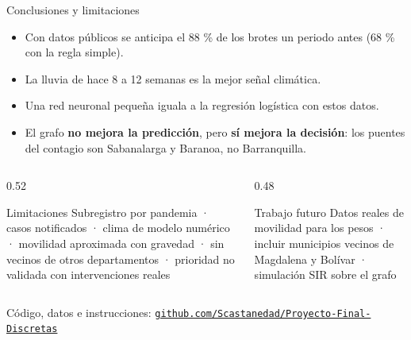 \documentclass[aspectratio=169,10pt]{beamer}
\newcommand{\pA}{Samuel Castañeda}
\newcommand{\orador}{}
\newcommand{\persona}[2]{\renewcommand{\orador}{Persona #1 · #2}}
\begin{document}
\persona{1}{\pA}
\begin{frame}{Conclusiones y limitaciones}
  \begin{itemize}\setlength\itemsep{5pt}
    \item Con datos públicos se anticipa el \alert{88 \%} de los brotes un periodo antes (68 \% con la regla simple).
    \item La lluvia de hace \alert{8 a 12 semanas} es la mejor señal climática.
    \item Una red neuronal pequeña \alert{iguala} a la regresión logística con estos datos.
    \item El grafo \textbf{no mejora la predicción}, pero \textbf{sí mejora la decisión}: los puentes del contagio son Sabanalarga y Baranoa, no Barranquilla.
  \end{itemize}
  \vspace{0.15cm}
  \begin{columns}[T]
    \begin{column}{0.52\textwidth}
      \begin{block}{Limitaciones}
        \footnotesize
        Subregistro por pandemia · casos notificados · clima de modelo numérico · movilidad aproximada con gravedad · sin vecinos de otros departamentos · prioridad no validada con intervenciones reales
      \end{block}
    \end{column}
    \begin{column}{0.48\textwidth}
      \begin{block}{Trabajo futuro}
        \footnotesize
        Datos reales de movilidad para los pesos · incluir municipios vecinos de Magdalena y Bolívar · simulación SIR sobre el grafo
      \end{block}
    \end{column}
  \end{columns}
  \vspace{0.2cm}
  \centering\small Código, datos e instrucciones: \href{https://github.com/Scastanedad/Proyecto-Final-Discretas}{\color{azul}\texttt{github.com/Scastanedad/Proyecto-Final-Discretas}}
\end{frame}
\end{document}
